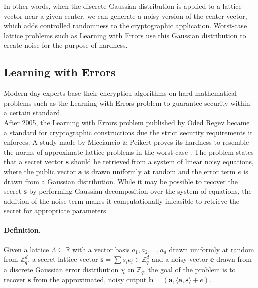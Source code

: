 \documentclass[11pt,
  titlepage=false,
  abstract=on,
]{scrreprt}
\begin{document}
In other words, when the discrete Gaussian distribution is applied to a lattice vector near a given center, we can generate a noisy version of the center vector, which adds controlled randomness 
to the cryptographic application. Worst-case lattice problems such as Learning with Errors use this Gaussian distribution to create noise for the purpose of hardness.

\subsection{Learning with Errors}
Modern-day experts base their encryption algorithms on hard mathematical problems such as the Learning with Errors problem to guarantee security within a certain standard.\\
After 2005, the Learning with Errors problem published by Oded Regev \cite{regev2010learning} became a standard for cryptographic constructions due the strict security requirements it enforces.
A study made by Micciancio \& Peikert proves its hardness to resemble the norms of approximate lattice problems in the worst case \cite{micciancio2013hardness}.
The problem states that a secret vector $\textbf{s}$ should be retrieved from a system of linear noisy equations, where the public vector $\textbf{a}$ is drawn uniformly at random
and the error term $\textit{e}$ is drawn from a Gaussian distribution. While it may be possible to recover the secret $\textbf{s}$
by performing Gaussian decomposition over the system of equations, the addition of the noise term makes it computationally infeasible to retrieve the
secret for appropriate parameters.
\paragraph{Definition.} Given a lattice $\Lambda \subseteq \mathbb{R}$ with a vector basis $a_1, a_2,..., a_d$ drawn uniformly at random from $\mathbb{Z}^d_q$, a secret lattice vector $\mathbf{s}=\sum s_ia_i \in \mathbb{Z}^d_q$ 
and a noisy vector $\mathbf{e}$ drawn from a discrete Gaussian error distribution $\chi$ on $\mathbb{Z}_q$, the goal of the problem is to recover $\mathbf{s}$ from the approximated, noisy output 
$\mathbf{b} = (\mathbf{a}, \langle \mathbf{a}, \mathbf{s} \rangle + e)$. \cite{regev2010learning}\\
\end{document}
